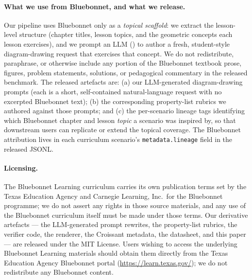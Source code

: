 \paragraph{What we use from Bluebonnet, and what we release.}
Our pipeline uses Bluebonnet only as a \emph{topical scaffold}: we extract the lesson-level structure (chapter titles, lesson topics, and the geometric concepts each lesson exercises), and we prompt an LLM (\sonnet) to author a fresh, student-style diagram-drawing request that exercises that concept.
We do not redistribute, paraphrase, or otherwise include any portion of the Bluebonnet textbook prose, figures, problem statements, solutions, or pedagogical commentary in the released benchmark.
The released artefacts are: (a) our LLM-generated diagram-drawing prompts (each is a short, self-contained natural-language request with no excerpted Bluebonnet text); (b) the corresponding property-list rubrics we authored against those prompts; and (c) the per-scenario lineage tags identifying which Bluebonnet chapter and lesson \emph{topic} a scenario was inspired by, so that downstream users can replicate or extend the topical coverage.
The Bluebonnet attribution lives in each curriculum scenario's \texttt{metadata.lineage} field in the released JSONL.

\paragraph{Licensing.}
The Bluebonnet Learning curriculum carries its own publication terms set by the Texas Education Agency and Carnegie Learning, Inc.\ for the Bluebonnet programme; we do not assert any rights in those source materials, and any use of the Bluebonnet curriculum itself must be made under those terms.
Our derivative artefacts --- the LLM-generated prompt rewrites, the property-list rubrics, the verifier code, the renderer, the Croissant metadata, the datasheet, and this paper --- are released under the MIT License.
Users wishing to access the underlying Bluebonnet Learning materials should obtain them directly from the Texas Education Agency Bluebonnet portal (\url{https://learn.texas.gov/}); we do not redistribute any Bluebonnet content.
